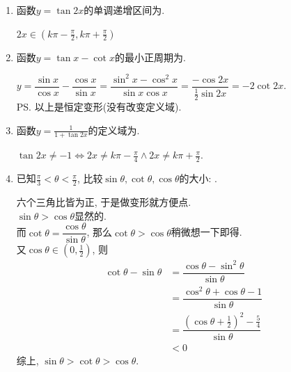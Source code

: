 \begin{enumerate}
    \item 函数$y=\tan2x$的单调递增区间为. 
    \begin{jieda}
    $2x\in(k\pi-\frac{\pi}{2},k\pi+\frac{\pi}{2})$
    \end{jieda}
    \item 函数$y=\tan{x}-\cot{x}$的最小正周期为. 
    \begin{jieda}
    $y=\dfrac{\sin{x}}{\cos{x}}-\dfrac{\cos{x}}{\sin{x}}=\dfrac{\sin^2x-\cos^2x}{\sin{x}\cos{x}}=\dfrac{-\cos2x}{\frac{1}{2}\sin2x}=-2\cot2x$. \\
    \ps 以上是恒定变形(没有改变定义域). 
    \end{jieda}
    \item 函数$y=\frac{1}{1+\tan2x}$的定义域为. 
    \begin{jieda}
    $\tan2x\neq -1\iff 2x\neq k\pi-\frac{\pi}{4}\land 2x\neq k\pi+\frac{\pi}{2}$. 
    \end{jieda}
    
    \item 已知$\frac{\pi}{3}<\theta<\frac{\pi}{2}$, 比较$\sin\theta,\cot\theta,\cos\theta$的大小: \blkda[4]{$\sin\theta>\cot\theta>\cos\theta$}. 
    \begin{jieda}
    六个三角比皆为正, 于是做变形就方便点. \\
    $\sin\theta>\cos\theta$显然的. \\
    而$\cot\theta=\dfrac{\cos\theta}{\sin\theta}$, 那么$\cot\theta>\cos\theta$稍微想一下即得. \\
    又$\cos\theta\in(0,\frac{1}{2})$, 则
    \begin{align*}
    \cot\theta-\sin\theta 
    & =\dfrac{\cos\theta-\sin^2\theta}{\sin\theta}\\
    & =\dfrac{\cos^2\theta+\cos\theta-1}{\sin\theta}\\
    & =\dfrac{(\cos\theta+\frac{1}{2})^2-\frac{5}{4}}{\sin\theta}\\
    & <0
    \end{align*}
    综上, $\sin\theta>\cot\theta>\cos\theta$. 
    \end{jieda}
    

\end{enumerate}
